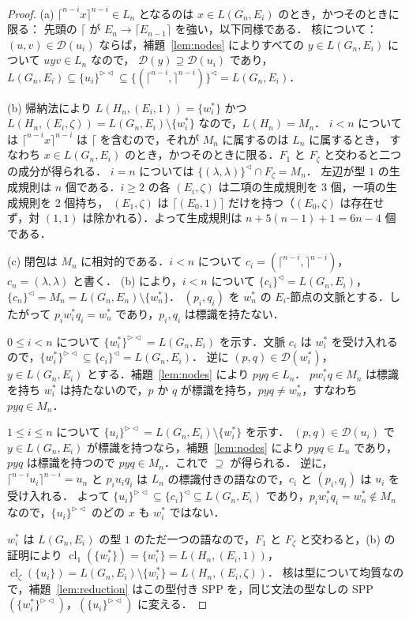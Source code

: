 \documentclass[11pt,a4paper]{ltjsarticle}
\numberwithin{equation}{section}
\theoremstyle{plain}
\theoremstyle{definition}
\theoremstyle{remark}
\theoremstyle{plain}
\newcommand{\eps}{\lambda}
\newcommand{\Lc}{^{\lhd}}
\newcommand{\RL}{^{\rhd\lhd}}
\newcommand{\cl}{\operatorname{cl}}
\newcommand{\D}{\mathcal D}
\newcommand{\Lce}{\lceil}
\newcommand{\Rce}{\rceil}
\begin{document}
\begin{proof}
(a) $\Lce^{n-i}x\Rce^{n-i}\in L_n$ となるのは $x\in L(G_n,E_i)$ のとき，かつそのときに限る：
先頭の $\Lce$ が $E_n\to\Lce E_{n-1}\Rce$ を強い，以下同様である．
核について：$(u,v)\in\D(u_i)$ ならば，補題~\ref{lem:nodes} によりすべての $y\in L(G_n,E_i)$ について $uyv\in L_n$ なので，
$\D(y)\supseteq\D(u_i)$ であり，
$L(G_n,E_i)\subseteq\{u_i\}\RL\subseteq\{(\Lce^{n-i},\Rce^{n-i})\}\Lc=L(G_n,E_i)$．

(b) 帰納法により $L(H_n,(E_i,1))=\{w^*_i\}$ かつ $L(H_n,(E_i,\zeta))=L(G_n,E_i)\setminus\{w^*_i\}$ なので，$L(H_n)=M_n$．
$i<n$ については $\Lce^{n-i}x\Rce^{n-i}$ は $\Lce$ を含むので，それが $M_n$ に属するのは $L_n$ に属するとき，
すなわち $x\in L(G_n,E_i)$ のとき，かつそのときに限る．$F_1$ と $F_\zeta$ と交わると二つの成分が得られる．
$i=n$ については $\{(\eps,\eps)\}\Lc\cap F_\zeta=M_n$．
左辺が型 $1$ の生成規則は $n$ 個である．$i\ge2$ の各 $(E_i,\zeta)$ は二項の生成規則を 3 個，一項の生成規則を 2 個持ち，
$(E_1,\zeta)$ は $\Lce(E_0,1)\Rce$ だけを持つ（$(E_0,\zeta)$ は存在せず，対 $(1,1)$ は除かれる）．よって生成規則は $n+5(n-1)+1=6n-4$ 個である．

(c) 閉包は $M_n$ に相対的である．$i<n$ について $c_i=(\Lce^{n-i},\Rce^{n-i})$，$c_n=(\eps,\eps)$ と書く．
(b) により，$i<n$ について $\{c_i\}\Lc=L(G_n,E_i)$，$\{c_n\}\Lc=M_n=L(G_n,E_n)\setminus\{w^*_n\}$．
$(p_i,q_i)$ を $w^*_n$ の $E_i$-節点の文脈とする．したがって $p_iw^*_iq_i=w^*_n$ であり，$p_i,q_i$ は標識を持たない．

$0\le i<n$ について $\{w^*_i\}\RL=L(G_n,E_i)$ を示す．文脈 $c_i$ は $w^*_i$ を受け入れるので，$\{w^*_i\}\RL\subseteq\{c_i\}\Lc=L(G_n,E_i)$．
逆に $(p,q)\in\D(w^*_i)$，$y\in L(G_n,E_i)$ とする．補題~\ref{lem:nodes} により $pyq\in L_n$．
$pw^*_iq\in M_n$ は標識を持ち $w^*_i$ は持たないので，$p$ か $q$ が標識を持ち，$pyq\ne w^*_n$，すなわち $pyq\in M_n$．

$1\le i\le n$ について $\{u_i\}\RL=L(G_n,E_i)\setminus\{w^*_i\}$ を示す．
$(p,q)\in\D(u_i)$ で $y\in L(G_n,E_i)$ が標識を持つなら，補題~\ref{lem:nodes} により $pyq\in L_n$ であり，$pyq$ は標識を持つので $pyq\in M_n$．これで $\supseteq$ が得られる．
逆に，$\Lce^{n-i}u_i\Rce^{n-i}=u_n$ と $p_iu_iq_i$ は $L_n$ の標識付きの語なので，$c_i$ と $(p_i,q_i)$ は $u_i$ を受け入れる．
よって $\{u_i\}\RL\subseteq\{c_i\}\Lc\subseteq L(G_n,E_i)$ であり，$p_iw^*_iq_i=w^*_n\notin M_n$ なので，$\{u_i\}\RL$ のどの $x$ も $w^*_i$ ではない．

$w^*_i$ は $L(G_n,E_i)$ の型 $1$ のただ一つの語なので，$F_1$ と $F_\zeta$ と交わると，(b) の証明により
$\cl_1(\{w^*_i\})=\{w^*_i\}=L(H_n,(E_i,1))$，$\cl_\zeta(\{u_i\})=L(G_n,E_i)\setminus\{w^*_i\}=L(H_n,(E_i,\zeta))$．
核は型について均質なので，補題~\ref{lem:reduction} はこの型付き SPP を，同じ文法の型なしの SPP $(\{w^*_i\}\RL)$，$(\{u_i\}\RL)$ に変える．
\end{proof}
\end{document}
